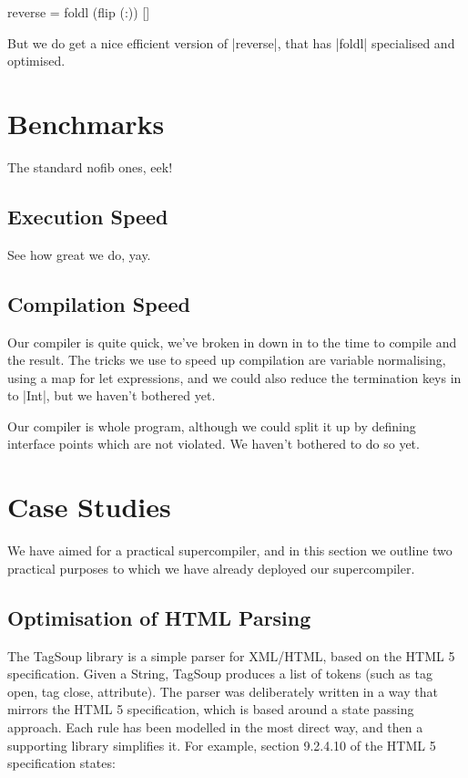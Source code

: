 \documentclass[draft]{sigplanconf}
\begin{document}
\begin{code}
reverse = foldl (flip (:)) []
\end{code}

But we do get a nice efficient version of |reverse|, that has |foldl| specialised and optimised.

\section{Benchmarks}
\label{sec:benchmarks}

The standard nofib ones, eek!

\subsection{Execution Speed}

See how great we do, yay.

\subsection{Compilation Speed}

Our compiler is quite quick, we've broken in down in to the time to compile and the result. The tricks we use to speed up compilation are variable normalising, using a map for let expressions, and we could also reduce the termination keys in to |Int|, but we haven't bothered yet.

Our compiler is whole program, although we could split it up by defining interface points which are not violated. We haven't bothered to do so yet.

\section{Case Studies}

We have aimed for a practical supercompiler, and in this section we outline two practical purposes to which we have already deployed our supercompiler.

\subsection{Optimisation of HTML Parsing}
\label{sec:tagsoup}

The TagSoup library \cite{tagsoup} is a simple parser for XML/HTML, based on the HTML 5 specification. Given a String, TagSoup produces a list of tokens (such as tag open, tag close, attribute). The parser was deliberately written in a way that mirrors the HTML 5 specification, which is based around a state passing approach. Each rule has been modelled in the most direct way, and then a supporting library simplifies it. For example, section 9.2.4.10 of the HTML 5 specification states:
\end{document}
